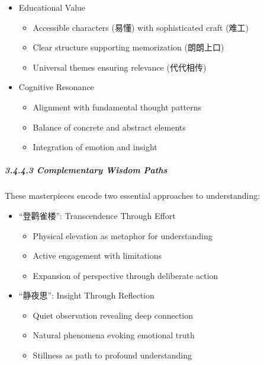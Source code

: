 \documentclass[
  11pt,
  letterpaper,
]{article}
\providecommand{\tightlist}{%
  \setlength{\itemsep}{0pt}\setlength{\parskip}{0pt}}
\begin{document}
\begin{itemize}
\tightlist
\item
  Educational Value

  \begin{itemize}
  \tightlist
  \item
    Accessible characters (易懂) with sophisticated craft (难工)
  \item
    Clear structure supporting memorization (朗朗上口)
  \item
    Universal themes ensuring relevance (代代相传)
  \end{itemize}
\item
  Cognitive Resonance

  \begin{itemize}
  \tightlist
  \item
    Alignment with fundamental thought patterns
  \item
    Balance of concrete and abstract elements
  \item
    Integration of emotion and insight
  \end{itemize}
\end{itemize}

\subparagraph{3.4.4.3 Complementary Wisdom
Paths}\label{complementary-wisdom-paths}

These masterpieces encode two essential approaches to understanding:

\begin{itemize}
\tightlist
\item
  ``登鹳雀楼'': Transcendence Through Effort

  \begin{itemize}
  \tightlist
  \item
    Physical elevation as metaphor for understanding
  \item
    Active engagement with limitations
  \item
    Expansion of perspective through deliberate action
  \end{itemize}
\item
  ``静夜思'': Insight Through Reflection

  \begin{itemize}
  \tightlist
  \item
    Quiet observation revealing deep connection
  \item
    Natural phenomena evoking emotional truth
  \item
    Stillness as path to profound understanding
  \end{itemize}
\end{itemize}
\end{document}
